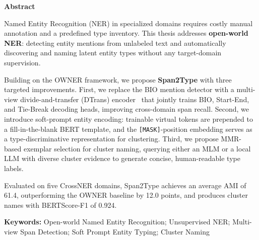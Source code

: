 \clearpage

{}
\begin{center}
	\textbf{\large Abstract}
\end{center}

Named Entity Recognition (NER) in specialized domains requires costly manual annotation and a predefined type inventory. This thesis addresses \textbf{open-world NER}: detecting entity mentions from unlabeled text and automatically discovering and naming latent entity types without any target-domain supervision.

Building on the OWNER framework, we propose \textbf{Span2Type} with three targeted improvements. First, we replace the BIO mention detector with a multi-view divide-and-transfer (DTrans) encoder~\cite{zhang-etal-2024-dtrans} that jointly trains BIO, Start-End, and Tie-Break decoding heads, improving cross-domain span recall. Second, we introduce soft-prompt entity encoding: trainable virtual tokens are prepended to a fill-in-the-blank BERT template, and the \texttt{[MASK]}-position embedding serves as a type-discriminative representation for clustering. Third, we propose MMR-based exemplar selection for cluster naming, querying either an MLM or a local LLM with diverse cluster evidence to generate concise, human-readable type labels.

Evaluated on five CrossNER domains, Span2Type achieves an average AMI of 61.4, outperforming the OWNER baseline by 12.0 points, and produces cluster names with BERTScore-F1 of 0.924.

\vspace*{1cm}

\noindent\textbf{Keywords:} Open-world Named Entity Recognition; Unsupervised NER; Multi-view Span Detection; Soft Prompt Entity Typing; Cluster Naming

